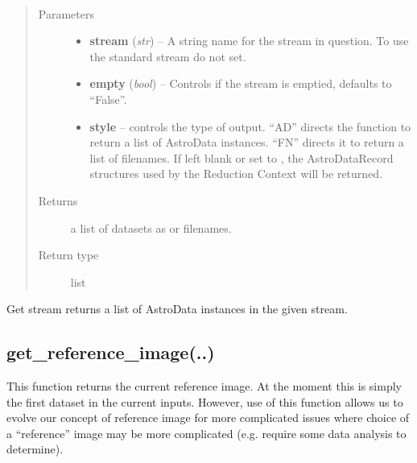 \documentclass[letterpaper,10pt,english]{sphinxmanual}
\begin{document}
\begin{fulllineitems}
\label{chapter_ReductionContextClass:astrodata.RecipeManager.ReductionContext.get_stream}~\begin{quote}\begin{description}
\item[{Parameters}] \leavevmode\begin{itemize}
\item {} 
\textbf{stream} (\emph{str}) -- A string name for the stream in question.  
To use the standard stream do not set.

\item {} 
\textbf{empty} (\emph{bool}) -- Controls if the stream is
emptied, defaults to ``False''.

\item {} 
\textbf{style} -- controls the type of output. ``AD'' directs the function
to return a list
of AstroData instances. ``FN'' directs it to return a list of filenames.
If left blank or set to , the AstroDataRecord structures used
by the Reduction Context will be returned.

\end{itemize}

\item[{Returns}] \leavevmode
a list of datasets as  or filenames.

\item[{Return type}] \leavevmode
list

\end{description}\end{quote}

Get stream returns a list of AstroData instances in the given stream.

\end{fulllineitems}



\subsection{get\_reference\_image(..)}
\label{chapter_ReductionContextClass:get-reference-image}

\begin{fulllineitems}
\label{chapter_ReductionContextClass:astrodata.RecipeManager.ReductionContext.get_reference_image}
This function returns the current reference image.  At the moment
this is simply the first dataset in the current inputs.  However,
use of this function allows us to evolve our concept of reference
image for more complicated issues where choice of a ``reference'' image
may be more complicated (e.g. require some data analysis to determine).

\end{fulllineitems}
\end{document}
